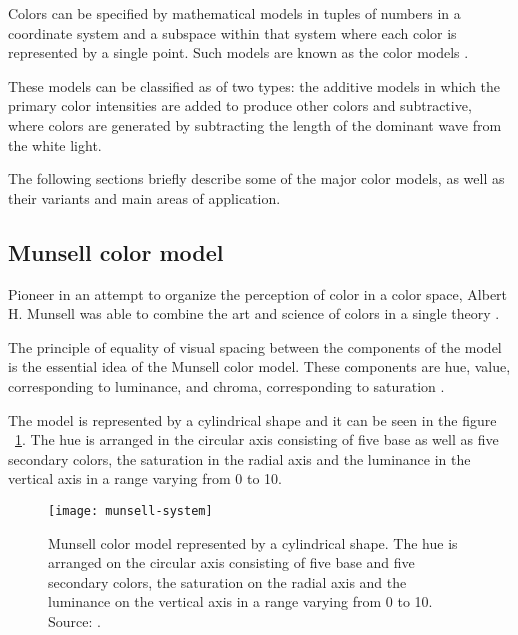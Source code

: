 Colors can be specified by mathematical models in tuples of numbers in a coordinate system and a subspace within that system where each color is represented by a single point. Such models are known as the color models \citep{gonzalez:02}.

These models can be classified as of two types: the additive models in which the primary color intensities are added to produce other colors and subtractive, where colors are generated by subtracting the length of the dominant wave from the white light.

The following sections briefly describe some of the major color models, as well as their variants and main areas of application.

\subsection{Munsell color model}
\label{sec:modelo_cores_munsell}

Pioneer in an attempt to organize the perception of color in a color space, Albert H. Munsell was able to combine the art and science of colors in a single theory \citep{konstantinos:00}.

The principle of equality of visual spacing between the components of the model is the essential idea of the Munsell color model. These components are hue, value, corresponding to luminance, and chroma, corresponding to saturation \citep{konstantinos:00}.

The model is represented by a cylindrical shape and it can be seen in the figure ~\ref{fig:munsell-system}. The hue is arranged in the circular axis consisting of five base as well as five secondary colors, the saturation in the radial axis and the luminance in the vertical axis in a range varying from 0 to 10.

\begin{figure}[!h]
  \centering
  \texttt{[image: munsell-system]}
  \caption[Munsell color model.]{Munsell color model represented by a cylindrical shape. The hue is arranged on the circular axis consisting of five base and five secondary colors, the saturation on the radial axis and the luminance on the vertical axis in a range varying from 0 to 10. Source: \citet{rus:07}.}
  \label{fig:munsell-system} 
\end{figure}

